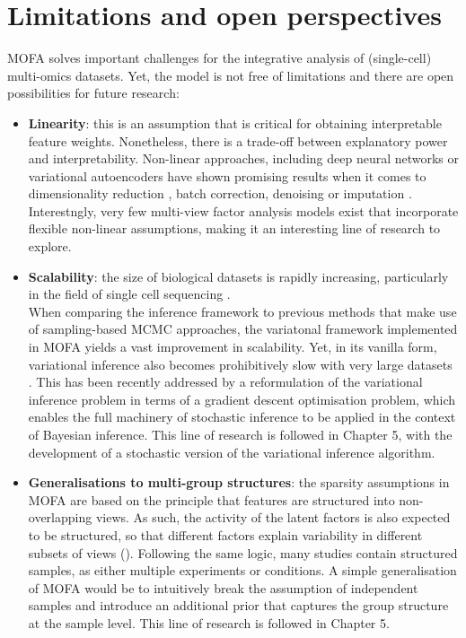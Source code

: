 \section{Limitations and open perspectives}

MOFA solves important challenges for the integrative analysis of (single-cell) multi-omics datasets. Yet, the model is not free of limitations and there are open possibilities for future research:

\begin{itemize}

	\item \textbf{Linearity}: this is an assumption that is critical for obtaining interpretable feature weights. Nonetheless, there is a trade-off between explanatory power and interpretability\cite{Kuhn}. Non-linear approaches, including deep neural networks or variational autoencoders have shown promising results when it comes to dimensionality reduction \cite{Lin2017,Ding2018,Lopez2018}, batch correction\cite{Lopez2018}, denoising \cite{Eraslan2019} or imputation \cite{Lin2016}. Interestngly, very few multi-view factor analysis models exist that incorporate flexible non-linear assumptions, making it an interesting line of research to explore.

	\item \textbf{Scalability}: the size of biological datasets is rapidly increasing, particularly in the field of single cell sequencing \cite{Svensson2018,Cao2019}. \\
	When comparing the inference framework to previous methods that make use of sampling-based MCMC approaches, the variatonal framework implemented in MOFA yields a vast improvement in scalability. Yet, in its vanilla form, variational inference also becomes prohibitively slow with very large datasets \cite{Hoffman2013,Blei2016,Hoffman2014}. This has been recently addressed by a reformulation of the variational inference problem in terms of a gradient descent optimisation problem, which enables the full machinery of stochastic inference to be applied in the context of Bayesian inference. This line of research is followed in Chapter 5, with the development of a stochastic version of the variational inference algorithm.

	\item \textbf{Generalisations to multi-group structures}: the sparsity assumptions in MOFA are based on the principle that features are structured into non-overlapping views. As such, the activity of the latent factors is also expected to be structured, so that different factors explain variability in different subsets of views (). Following the same logic, many studies contain structured samples, as either multiple experiments or conditions. A simple generalisation of MOFA would be to intuitively break the assumption of independent samples and introduce an additional prior that captures the group structure at the sample level. This line of research is followed in Chapter 5.


\end{itemize}
